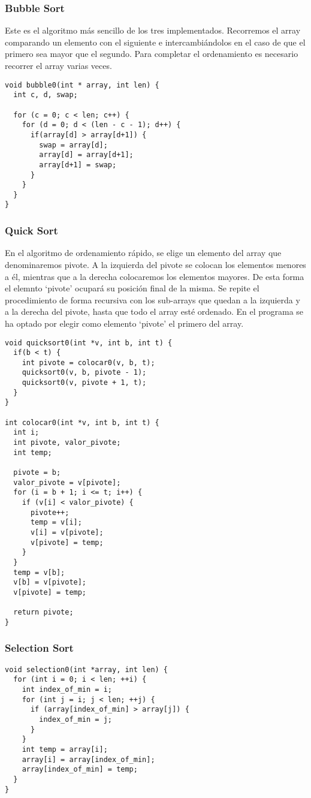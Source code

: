 \subsubsection{Bubble Sort}
Este es el algoritmo más sencillo de los tres implementados. Recorremos el array comparando un elemento con el siguiente e intercambiándolos en el caso de que el primero sea mayor que el segundo. Para completar el ordenamiento es necesario recorrer el array varias veces.
\begin{lstlisting}[caption=Implementación de Bubble Sort]
void bubble0(int * array, int len) {
  int c, d, swap;

  for (c = 0; c < len; c++) {
    for (d = 0; d < (len - c - 1); d++) {
      if(array[d] > array[d+1]) {
        swap = array[d];
        array[d] = array[d+1];
        array[d+1] = swap;
      }
    }
  }
}  
\end{lstlisting}\label{Implementación de Bubble Sort en nuestro programa}

\subsubsection{Quick Sort}
En el algoritmo de ordenamiento rápido, se elige un elemento del array que denominaremos pivote. A la izquierda del pivote se colocan los elementos menores a él, mientras que a la derecha colocaremos los elementos mayores. De esta forma el elemnto `pivote' ocupará su posición final de la misma. Se repite el procedimiento de forma recursiva con los sub-arrays que quedan a la izquierda y a la derecha del pivote, hasta que todo el array esté ordenado. En el programa se ha optado por elegir como elemento `pivote' el primero del array.
\begin{lstlisting}[caption=Implementación de Quick Sort]
void quicksort0(int *v, int b, int t) {
  if(b < t) {
    int pivote = colocar0(v, b, t);
    quicksort0(v, b, pivote - 1);
    quicksort0(v, pivote + 1, t);
  }
}

int colocar0(int *v, int b, int t) {
  int i;
  int pivote, valor_pivote;
  int temp;

  pivote = b;
  valor_pivote = v[pivote];
  for (i = b + 1; i <= t; i++) {
    if (v[i] < valor_pivote) {
      pivote++;
      temp = v[i];
      v[i] = v[pivote];
      v[pivote] = temp;
    }
  }
  temp = v[b];
  v[b] = v[pivote];
  v[pivote] = temp;

  return pivote;
}
\end{lstlisting}

\subsubsection{Selection Sort}

\begin{lstlisting}[caption=Implementación de Selection Sort]
void selection0(int *array, int len) {
  for (int i = 0; i < len; ++i) {
    int index_of_min = i;
    for (int j = i; j < len; ++j) {
      if (array[index_of_min] > array[j]) {
        index_of_min = j;
      }
    }
    int temp = array[i];
    array[i] = array[index_of_min];
    array[index_of_min] = temp;
  }
}
\end{lstlisting}
